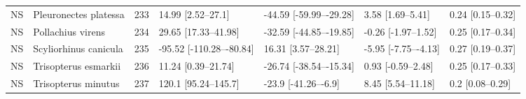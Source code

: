 \begin{longtable}[t]{lllllll}
NS & Pleuronectes platessa & 233 & 14.99 [2.52–27.1] & -44.59 [-59.99–-29.28] & 3.58 [1.69–5.41] & 0.24 [0.15–0.32]\\
NS & Pollachius virens & 234 & 29.65 [17.33–41.98] & -32.59 [-44.85–-19.85] & -0.26 [-1.97–1.52] & 0.25 [0.17–0.34]\\
NS & Scyliorhinus canicula & 235 & -95.52 [-110.28–-80.84] & 16.31 [3.57–28.21] & -5.95 [-7.75–-4.13] & 0.27 [0.19–0.37]\\
\addlinespace
NS & Trisopterus esmarkii & 236 & 11.24 [0.39–21.74] & -26.74 [-38.54–-15.34] & 0.93 [-0.59–2.48] & 0.25 [0.17–0.33]\\
NS & Trisopterus minutus & 237 & 120.1 [95.24–145.7] & -23.9 [-41.26–-6.9] & 8.45 [5.54–11.18] & 0.2 [0.08–0.29]\\*
\end{longtable}